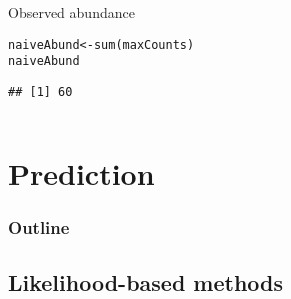 \documentclass[color=usenames,dvipsnames]{beamer}\usepackage[]{graphicx}\usepackage[]{xcolor}
\makeatletter
\newcommand{\hlstd}[1]{\textcolor[rgb]{0,0,0}{#1}}%
\newcommand{\hlkwb}[1]{\textcolor[rgb]{0,0.341,0.682}{#1}}%
\newcommand{\hlkwd}[1]{\textcolor[rgb]{0.004,0.004,0.506}{#1}}%
\newenvironment{kframe}{%
 \def\at@end@of@kframe{}%
 \ifinner\ifhmode%
  \def\at@end@of@kframe{\end{minipage}}%
  \begin{minipage}{\columnwidth}%
 \fi\fi%
 \def\FrameCommand##1{\hskip\@totalleftmargin \hskip-\fboxsep
 \colorbox{shadecolor}{##1}\hskip-\fboxsep
     \hskip-\linewidth \hskip-\@totalleftmargin \hskip\columnwidth}%
 \MakeFramed {\advance\hsize-\width
   \@totalleftmargin\z@ \linewidth\hsize
   \@setminipage}}%
 {\par\unskip\endMakeFramed%
 \at@end@of@kframe}
\newenvironment{knitrout}{}{} %
\makeatother
\begin{document}
\begin{frame}[fragile]
\begin{columns}
\begin{column}{0.6\textwidth}
\vfill
\small
Observed abundance \\
\begin{knitrout}\scriptsize
{}\color{fgcolor}\begin{kframe}
\begin{alltt}
\hlstd{naiveAbund} \hlkwb{<-} \hlkwd{sum}\hlstd{(maxCounts)}
\hlstd{naiveAbund}
\end{alltt}
\begin{verbatim}
## [1] 60
\end{verbatim}
\end{kframe}
\end{knitrout}

  \end{column}
  \end{columns}
\end{frame}



\section{Prediction}



\begin{frame}
  \frametitle{Outline}
  \Large
  \tableofcontents[currentsection]
\end{frame}



\subsection{Likelihood-based methods}
\end{document}
